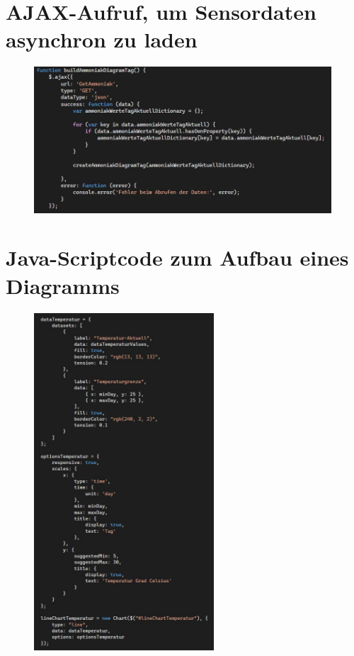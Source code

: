\documentclass[conference]{IEEEtran}
\begin{document}
\begin{appendices}
\clearpage
\section{AJAX-Aufruf, um Sensordaten asynchron zu laden}
\label{sec:ajaxAnhang}
\begin{figure}[h]
    \centering
    \includegraphics[width=0.99\textwidth]{fig/ajax.JPG}
\end{figure}

\clearpage
\section{Java-Scriptcode zum Aufbau eines Diagramms}
\label{sec:jsdiagrammanhang}
\begin{figure}[h]
    \centering
    \includegraphics[width=0.60\textwidth]{fig/diagrammCode.JPG}
\end{figure}

\end{appendices}
\end{document}
